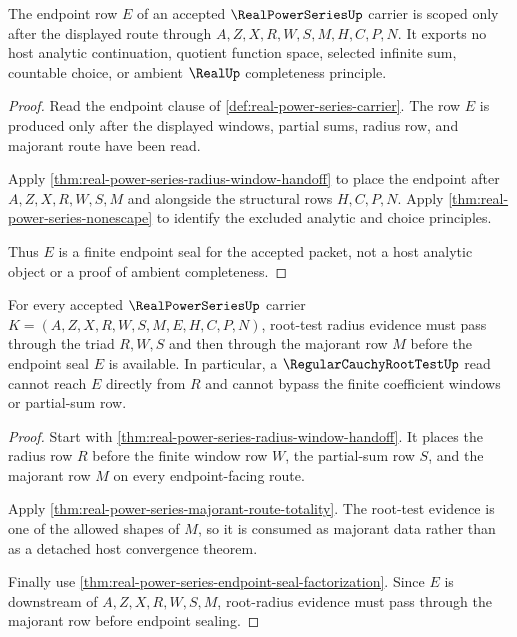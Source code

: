 \begin{theorem}\label{thm:real-power-series-endpoint-seal-scope}
The endpoint row $E$ of an accepted $\RealPowerSeriesUp$ carrier is scoped only after the displayed route through $A,Z,X,R,W,S,M,H,C,P,N$. It exports no host analytic continuation, quotient function space, selected infinite sum, countable choice, or ambient $\RealUp$ completeness principle.
\end{theorem}
\begin{proof}
Read the endpoint clause of \autoref{def:real-power-series-carrier}. The row $E$ is produced only after the displayed windows, partial sums, radius row, and majorant route have been read.

Apply \autoref{thm:real-power-series-radius-window-handoff} to place the endpoint after $A,Z,X,R,W,S,M$ and alongside the structural rows $H,C,P,N$. Apply \autoref{thm:real-power-series-nonescape} to identify the excluded analytic and choice principles.

Thus $E$ is a finite endpoint seal for the accepted packet, not a host analytic object or a proof of ambient completeness.
\end{proof}

\begin{theorem}
\label{thm:realpowerseries-root-radius-majorant-triad}
For every accepted $\RealPowerSeriesUp$ carrier $K=(A,Z,X,R,W,S,M,E,H,C,P,N)$, root-test radius evidence must pass through the triad $R,W,S$ and then through the majorant row $M$ before the endpoint seal $E$ is available. In particular, a $\RegularCauchyRootTestUp$ read cannot reach $E$ directly from $R$ and cannot bypass the finite coefficient windows or partial-sum row.
\end{theorem}
\begin{proof}
Start with \autoref{thm:real-power-series-radius-window-handoff}. It places the radius row $R$ before the finite window row $W$, the partial-sum row $S$, and the majorant row $M$ on every endpoint-facing route.

Apply \autoref{thm:real-power-series-majorant-route-totality}. The root-test evidence is one of the allowed shapes of $M$, so it is consumed as majorant data rather than as a detached host convergence theorem.

Finally use \autoref{thm:real-power-series-endpoint-seal-factorization}. Since $E$ is downstream of $A,Z,X,R,W,S,M$, root-radius evidence must pass through the majorant row before endpoint sealing.
\end{proof}

